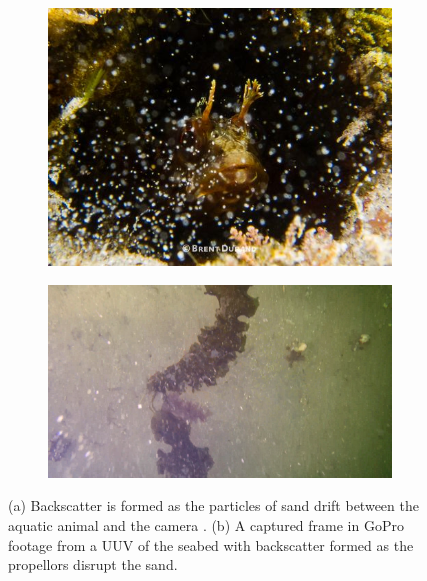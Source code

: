 \begin{figure}[h]
    \centering
    \begin{subfigure}{.49\textwidth}
        \centering
        \includegraphics[width=1\linewidth]{assets/backscatter_article_durand2.jpg}
        \caption{}
        \label{subfig:backscatter_durand}
    \end{subfigure}
    \hfill
    \begin{subfigure}{.49\textwidth}
        \centering
        \includegraphics[width=1\linewidth]{assets/backscatter_test_vid.png}
        \caption{}
        \label{subfig:backscatter_gopro}
    \end{subfigure}
    \caption{(a) Backscatter is formed as the particles of sand drift between the aquatic animal and the camera \cite{brentdurandEasyWaysEliminate2013}. (b) A captured frame in GoPro footage from a UUV of the seabed with backscatter formed as the propellors disrupt the sand.}
    \label{fig:backscatter}
\end{figure}

